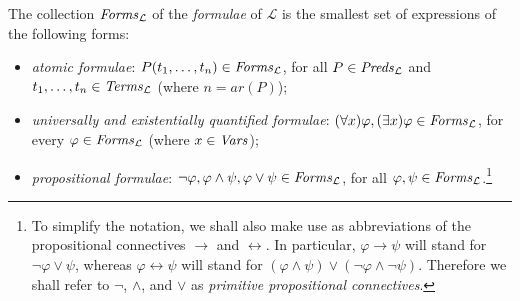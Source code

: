 \documentclass[a4paper]{llncs}
\newcommand{\Lang}{\ensuremath{\mathcal{L}\xspace}} %
\newcommand{\LangPreds}{\Preds_{\Lang}}
\newcommand{\LangTerms}{\Terms_{\Lang}}
\newcommand{\LangForms}{\Forms_{\Lang}}
\newcommand{\ar}{\mathit{ar}}
\newcommand{\nat}{\mathbb{N}}
\begin{document}
The collection $\LangForms$ of the \emph{formulae} of
$\Lang$ is the smallest set of expressions of the following forms:
\begin{itemize}
  \item \emph{atomic formulae}: $P(t_1, \ldots, t_n) \in \LangForms$, 
for all $P \in \LangPreds$ and $t_1, \ldots, t_n \in \LangTerms$ 
(where $n = \ar(P)$);
%

  \item \emph{universally and existentially quantified formulae}:
  $(\forall x)\varphi, (\exists x)\varphi \in \LangForms$, for every 
$\varphi \in \LangForms$ (where $x \in \mathit{Vars}$);

  \item \emph{propositional formulae}: $\neg \varphi, \varphi \wedge 
\psi,   \varphi \vee \psi \in \LangForms$, for all $\varphi, \psi \in 
\LangForms$.\footnote{To simplify the notation, we shall also make 
use as abbreviations of the propositional connectives $\rightarrow$ 
and $\leftrightarrow$. In particular, $\varphi \rightarrow \psi$ will 
stand for $\neg \varphi \vee \psi$, whereas $\varphi \leftrightarrow 
\psi$ will stand for $(\varphi \wedge \psi) \vee (\neg \varphi \wedge 
\neg\psi)$. Therefore we shall refer to $\neg$, $\wedge$, and $\vee$ 
as \emph{primitive propositional connectives}.}
%
\end{itemize}
\end{document}
